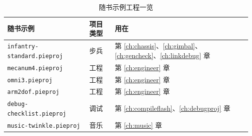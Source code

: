 \begin{table}[htbp]
  \centering
  \small
  \begin{tabular}{@{}lll@{}}
    \toprule
    随书示例 & 项目类型 & 用在 \\
    \midrule
    \texttt{infantry-standard.pieproj} & 步兵 & 第 \ref{ch:chassis}、\ref{ch:gimbal}、\ref{ch:gencheck}、\ref{ch:linkdebug} 章 \\
    \texttt{mecanum4.pieproj} & 工程 & 第 \ref{ch:engineer} 章 \\
    \texttt{omni3.pieproj} & 工程 & 第 \ref{ch:engineer} 章 \\
    \texttt{arm2dof.pieproj} & 工程 & 第 \ref{ch:engineer} 章 \\
    \texttt{debug-checklist.pieproj} & 调试 & 第 \ref{ch:compileflash}、\ref{ch:debugproj} 章 \\
    \texttt{music-twinkle.pieproj} & 音乐 & 第 \ref{ch:music} 章 \\
    \bottomrule
  \end{tabular}
  \caption{随书示例工程一览}
  \label{tab:ch01-examples}
\end{table}

